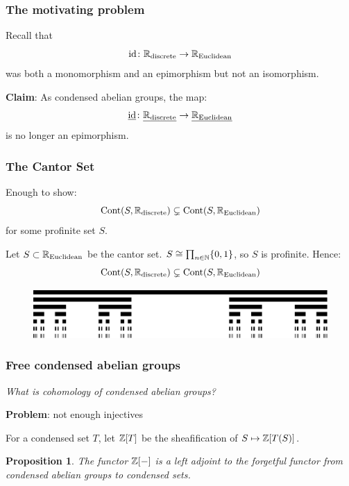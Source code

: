 \documentclass{beamer}
\newtheorem{proposition}{Proposition}
\DeclareMathOperator{\Cont}{Cont}
\DeclareMathOperator{\id}{id}
\begin{document}
\begin{frame}
    \frametitle{The motivating problem}

    Recall that
    \begin{equation*}
        \id \colon \bbR_{\text{discrete}} \to \bbR_{\text{Euclidean}}
    \end{equation*}
    was both a monomorphism and an epimorphism but not an isomorphism.
    \pause

    \textbf{Claim}: As condensed abelian groups, the map:
    \begin{equation*}
        \underline{\id} \colon \underline{\bbR_{\text{discrete}}} \to \underline{\bbR_{\text{Euclidean}}}
    \end{equation*}
    is no longer an epimorphism.
\end{frame}
\begin{frame}
    \frametitle{The Cantor Set}
    Enough to show:
    \begin{equation*}
        \Cont(S, \bbR_{\text{discrete}}) \subsetneq \Cont(S, \bbR_{\text{Euclidean}})
    \end{equation*}
    for some profinite set $S$.

    \pause
    \medskip

    Let $S \subset \mathbb{R}_{\text{Euclidean}}$ be the cantor set.
    $ S \cong \prod_{n\in \mathbb{N}}\{0,1\}$,
    so $S$ is profinite.
    Hence:
    \begin{equation*}
        \Cont(S, \bbR_{\text{discrete}}) \subsetneq \Cont(S, \bbR_{\text{Euclidean}})
    \end{equation*}

    \begin{figure}
        \centering
        \includegraphics[scale=0.5]{Cantor_set_in_seven_iterations.pdf}
    \end{figure}

\end{frame}
\begin{frame}
    \frametitle{Free condensed abelian groups}

    \begin{center}
        \textit{What is cohomology of condensed abelian groups?}
    \end{center}
    \pause
    \textbf{Problem}: not enough injectives
    \medskip

    \pause
    For a condensed set $T$, let $\mathbb{Z}[T]$ be the sheafification
    of $S \mapsto \mathbb{Z}[T(S)]$.

    \begin{proposition}
        The functor $\mathbb{Z}[-]$ is a left adjoint to the forgetful functor
        from condensed abelian groups to condensed sets.
    \end{proposition}
\end{frame}
\end{document}
